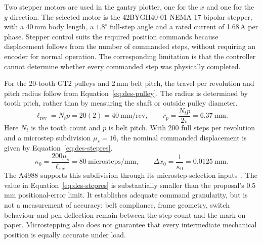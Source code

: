 Two stepper motors are used in the gantry plotter, one for the $x$ and one for the $y$ direction. The selected motor is the 42BYGH40-01 NEMA 17 bipolar stepper, with a 40\,mm body length, a $1.8^\circ$ full-step angle and a rated current of 1.68\,A per phase. Stepper control suits the required position commands because displacement follows from the number of commanded steps, without requiring an encoder for normal operation. The corresponding limitation is that the controller cannot determine whether every commanded step was physically completed.

For the 20-tooth GT2 pulleys and 2\,mm belt pitch, the travel per revolution and pitch radius follow from Equation~\ref{eq:des-pulley}. The radius is determined by tooth pitch, rather than by measuring the shaft or outside pulley diameter.
\begin{equation}
\ell_{\mathrm{rev}}=N_t p=20(2)=40\ \mathrm{mm/rev},\qquad
r_p=\frac{N_t p}{2\pi}=6.37\ \mathrm{mm}.
\label{eq:des-pulley}
\end{equation}
Here $N_t$ is the tooth count and $p$ is belt pitch. With 200 full steps per revolution and a microstep subdivision $\mu_s=16$, the nominal commanded displacement is given by Equation~\ref{eq:des-stepres}.
\begin{equation}
\kappa_0=\frac{200\mu_s}{\ell_{\mathrm{rev}}}=80\ \mathrm{microsteps/mm},\qquad
\Delta x_0=\frac{1}{\kappa_0}=0.0125\ \mathrm{mm}.
\label{eq:des-stepres}
\end{equation}
The A4988 supports this subdivision through its microstep-selection inputs~\cite[p.~6, Table~1]{a4988ds}. The value in Equation~\ref{eq:des-stepres} is substantially smaller than the proposal's 0.5\,mm positional-error limit. It establishes adequate command granularity, but is not a measurement of accuracy: belt compliance, frame geometry, switch behaviour and pen deflection remain between the step count and the mark on paper. Microstepping also does not guarantee that every intermediate mechanical position is equally accurate under load.

